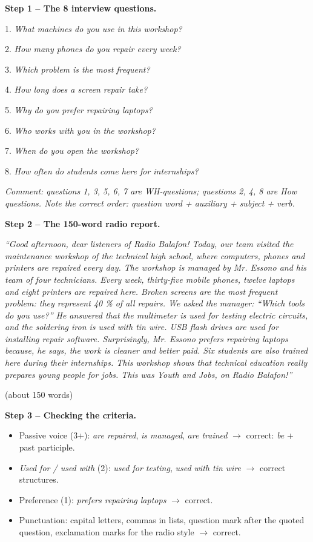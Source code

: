\documentclass[11pt]{article}
\begin{document}
\begin{exoresolu}
\textbf{Step 1 -- The 8 interview questions.}\par
1. \emph{What machines do you use in this workshop?}\par
2. \emph{How many phones do you repair every week?}\par
3. \emph{Which problem is the most frequent?}\par
4. \emph{How long does a screen repair take?}\par
5. \emph{Why do you prefer repairing laptops?}\par
6. \emph{Who works with you in the workshop?}\par
7. \emph{When do you open the workshop?}\par
8. \emph{How often do students come here for internships?}\par
\textit{Comment: questions 1, 3, 5, 6, 7 are WH-questions; questions 2, 4, 8 are How questions. Note the correct order: question word + auxiliary + subject + verb.}

\tcblower

\textbf{Step 2 -- The 150-word radio report.}\par
\emph{``Good afternoon, dear listeners of Radio Balafon! Today, our team visited the maintenance workshop of the technical high school, where computers, phones and printers are repaired every day. The workshop is managed by Mr. Essono and his team of four technicians. Every week, thirty-five mobile phones, twelve laptops and eight printers are repaired here. Broken screens are the most frequent problem: they represent 40 \% of all repairs. We asked the manager: ``Which tools do you use?'' He answered that the multimeter is used for testing electric circuits, and the soldering iron is used with tin wire. USB flash drives are used for installing repair software. Surprisingly, Mr. Essono prefers repairing laptops because, he says, the work is cleaner and better paid. Six students are also trained here during their internships. This workshop shows that technical education really prepares young people for jobs. This was Youth and Jobs, on Radio Balafon!''}\par
(about 150 words)

\textbf{Step 3 -- Checking the criteria.}
\begin{itemize}
\item Passive voice (3+): \emph{are repaired}, \emph{is managed}, \emph{are trained} $\rightarrow$ correct: \emph{be} + past participle.
\item \emph{Used for / used with} (2): \emph{used for testing}, \emph{used with tin wire} $\rightarrow$ correct structures.
\item Preference (1): \emph{prefers repairing laptops} $\rightarrow$ correct.
\item Punctuation: capital letters, commas in lists, question mark after the quoted question, exclamation marks for the radio style $\rightarrow$ correct.
\end{itemize}


\end{exoresolu}
\end{document}
